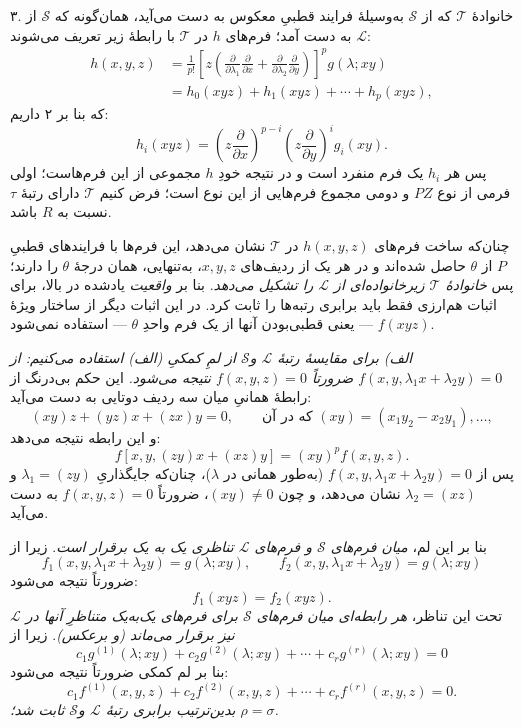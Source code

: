 \documentclass[11pt]{article}
\begin{document}
۳. خانوادهٔ $\mathcal T$ که از $\mathcal S$ به‌وسیلهٔ فرایند قطبیِ معکوس به دست می‌آید، همان‌گونه که $\mathcal S$ از $\mathcal L$ به دست آمد؛ فرم‌های $h$ در $\mathcal T$ با رابطهٔ زیر تعریف می‌شوند:
\[
\begin{aligned}
 h(x,y,z)
 &=\frac1{p!}\left[z\left(\frac{\partial}{\partial\lambda_1}\frac{\partial}{\partial x}
 +\frac{\partial}{\partial\lambda_2}\frac{\partial}{\partial y}\right)\right]^p g(\lambda;xy)\\
 &=h_0(xyz)+h_1(xyz)+\cdots+h_p(xyz),
\end{aligned}
\]
که بنا بر ۲ داریم:
\[
  h_i(xyz)=
  \left(z\frac{\partial}{\partial x}\right)^{p-i}
  \left(z\frac{\partial}{\partial y}\right)^i g_i(xy).
\]
پس هر $h_i$ یک فرم منفرد است و در نتیجه خودِ $h$ مجموعی از این فرم‌هاست؛ اولی فرمی از نوع $PZ$ و دومی مجموع فرم‌هایی از این نوع است؛ فرض کنیم $\mathcal T$ دارای رتبهٔ $\tau$ نسبت به $R$ باشد.

چنان‌که ساخت فرم‌های $h(x,y,z)$ در $\mathcal T$ نشان می‌دهد، این فرم‌ها با فرایندهای قطبیِ $P$ از $\theta$ حاصل شده‌اند و در هر یک از ردیف‌های $x,y,z$، به‌تنهایی، همان درجهٔ $\theta$ را دارند؛ پس \emph{خانوادهٔ $\mathcal T$ زیرخانواده‌ای از $\mathcal L$ را تشکیل می‌دهد}. بنا بر \emph{واقعیت} یادشده در بالا، برای اثبات هم‌ارزی فقط باید برابری رتبه‌ها را ثابت کرد. در این اثبات دیگر از ساختار ویژهٔ $f(xyz)$ --- یعنی قطبی‌بودن آنها از یک فرم واحدِ $\theta$ --- استفاده نمی‌شود.

\emph{الف) برای مقایسهٔ رتبهٔ $\mathcal L$ و$\mathcal S$ از لمِ کمکیِ (الف) استفاده می‌کنیم: از $f(x,y,\lambda_1x+\lambda_2y)=0$ ضرورتاً $f(x,y,z)=0$ نتیجه می‌شود.} این حکم بی‌درنگ از رابطهٔ همانیِ میان سه ردیف دوتایی به دست می‌آید:
\[
  (xy)z+(yz)x+(zx)y=0,
  \qquad \text{که در آن }(xy)=(x_1y_2-x_2y_1),\ldots,
\]
و این رابطه نتیجه می‌دهد:
\[
  f[x,y,(zy)x+(xz)y]=(xy)^p f(x,y,z).
\]
پس از $f(x,y,\lambda_1x+\lambda_2y)=0$ (به‌طور همانی در $\lambda$)، چنان‌که جایگذاریِ $\lambda_1=(zy)$ و $\lambda_2=(xz)$ نشان می‌دهد، و چون $(xy)\ne0$، ضرورتاً $f(x,y,z)=0$ به دست می‌آید.

بنا بر این لم، \emph{میان فرم‌های $\mathcal S$ و فرم‌های $\mathcal L$ تناظری یک به یک برقرار است}. زیرا از
\[
  f_1(x,y,\lambda_1x+\lambda_2y)=g(\lambda;xy),\qquad
  f_2(x,y,\lambda_1x+\lambda_2y)=g(\lambda;xy)
\]
ضرورتاً نتیجه می‌شود:
\[
  f_1(xyz)=f_2(xyz).
\]
تحت این تناظر، \emph{هر رابطه‌ای میان فرم‌های $\mathcal S$ برای فرم‌های یک‌به‌یک متناظرِ آنها در $\mathcal L$ نیز برقرار می‌ماند (و برعکس)}. زیرا از
\[
  c_1g^{(1)}(\lambda;xy)+c_2g^{(2)}(\lambda;xy)+\cdots+c_rg^{(r)}(\lambda;xy)=0
\]
بنا بر لم کمکی ضرورتاً نتیجه می‌شود:
\[
  c_1f^{(1)}(x,y,z)+c_2f^{(2)}(x,y,z)+\cdots+c_rf^{(r)}(x,y,z)=0.
\]
\emph{بدین‌ترتیب برابری رتبهٔ $\mathcal L$ و$\mathcal S$ ثابت شد؛ $\rho=\sigma$.}
\end{document}
